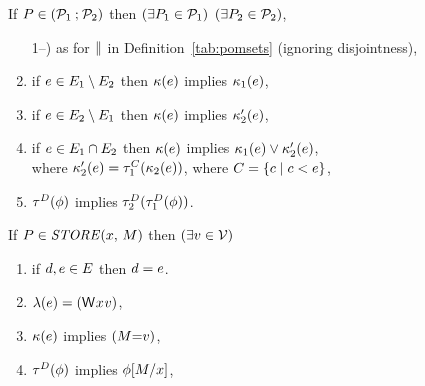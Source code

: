 \begin{definition}
  \noindent
  If $\aPS\SB0 \in (\aPSS_1\sSEMI\aPSS_2)$ then
  $(\exists\aPS_1\in\aPSS_1)$ $(\exists\aPS_2\in\aPSS_2)$,
  \begin{enumerate}
  \setcounter{enumi}{\value{pomsetParCount}}
  \item[1--\thepomsetParCount)] as for $\sPAR$  in
    Definition~\ref{tab:pomsets} (ignoring disjointness),
  \item if $\aEv\in\aEvs_1\setminus\aEvs_2$ then $\labelingForm\SB0(\aEv)$ implies $\labelingForm_1(\aEv)$,
  \item if $\aEv\in\aEvs_2\setminus\aEvs_1$ then $\labelingForm\SB0(\aEv)$ implies $\labelingForm'_2(\aEv)$,
  \item if $\aEv\in\aEvs_1\cap\aEvs_2$ then $\labelingForm\SB0(\aEv)$ implies $\labelingForm_1(\aEv)\lor\labelingForm'_2(\aEv)$,
  \\ where $\labelingForm'_2(\aEv)=\aTr[\cEvs]_1(\labelingForm_2(\aEv))$, where $\cEvs=\{ \cEv \mid \cEv <\SB0 \aEv \}$,
  \item $\aTr[\bEvs]\SB0(\aForm)$ implies $\aTr[\bEvs]_2(\aTr[\bEvs]_1(\aForm))$.
    \setcounter{pomsetXSemiCount}{\value{enumi}}
  \end{enumerate}

  \noindent
  If $\aPS\SB0 \in \sSTORE{\aLoc}{\aExp}$ then
  $(\exists\aVal\in\Val)$
  \begin{enumerate}
  \item if $\bEv,\aEv\in\aEvs\SB0$ then $\bEv=\aEv$.
  \item $\labelingAct\SB0(\aEv) = \DWP{\aLoc}{\aVal}$,
  \item $\labelingForm\SB0(\aEv)$ implies $(\aExp{=}\aVal)$,
  \item %
    $\aTr[\bEvs]\SB0(\aForm)$ implies $\aForm[\aExp/\aLoc]$,
  \end{enumerate}


\end{definition}
